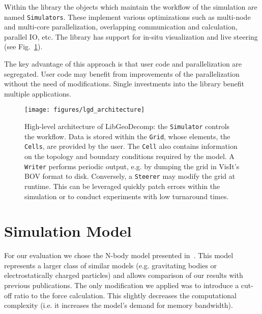 \documentclass{sig-alternate}
\newcommand{\ctype}[1]{\texttt{{{#1}}}}
\newcommand{\upp}{\vspace*{-0.5em}}
\newcommand{\up}{\vspace*{-0.25em}}
\begin{document}
Within the library the objects which maintain the workflow of the
simulation are named \ctype{Simulators}. These implement various optimizations
such as multi-node and multi-core parallelization, overlapping
communication and calculation, parallel IO, etc. The library has
support for in-situ visualization and live steering (see Fig.~\ref{fig:lgdarch}).

The key advantage of this approach is that user code and
parallelization are segregated. User code may benefit from
improvements of the parallelization without the need of modifications.
Single investments into the library benefit multiple applications.


\begin{figure}
  \texttt{[image: figures/lgd\_architecture]}
    \upp\upp
  \caption{High-level architecture of LibGeoDecomp: the \ctype{Simulator}
    controls the workflow. Data is stored within the \ctype{Grid}, whose
    elements, the \ctype{Cells}, are provided by the user. The \ctype{Cell} also
    contains information on the topology and boundary conditions
    required by the model.
    A \ctype{Writer} performs periodic output, e.g. by dumping the grid in VisIt's BOV
    format to disk. Conversely, a \ctype{Steerer} may modify the grid at
    runtime. This can be leveraged quickly patch errors within the
    simulation or to conduct experiments with low turnaround times.}
\upp\upp
\label{fig:lgdarch}
\end{figure}

\section{Simulation Model}
\label{sec:simulation}

For our evaluation we chose the N-body model presented
in~\cite{colfax}. This model represents a larger class of similar
models (e.g. gravitating bodies or electrostatically charged
particles) and allows comparison of our results with previous
publications. The only modification we applied was to introduce a
cut-off ratio to the force calculation. This slightly decreases the
computational complexity (i.e. it increases the model's demand for
memory bandwidth).
\end{document}
